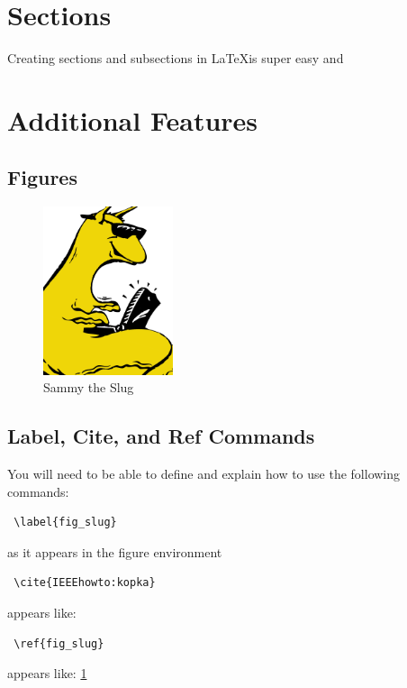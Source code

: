 \documentclass[12pt,journal,compsoc]{IEEEtran}
\begin{document}
\section{Sections}
Creating sections and subsections in \LaTeX \space is super easy and 



\section{Additional Features}

\subsection{Figures}


\begin{figure}[h] 	%
\centering
\includegraphics[width=1.5in]{slug.pdf}
\caption{Sammy the Slug}
\label{fig_slug}
\end{figure}


\subsection{Label, Cite, and Ref Commands}
You will need to be able to define and explain how to use the following commands:
\begin{verbatim} \label{fig_slug} \end{verbatim} as it appears in the figure environment\\
\begin{verbatim} \cite{IEEEhowto:kopka} \end{verbatim} appears like: \cite{IEEEhowto:kopka}\\
\begin{verbatim} \ref{fig_slug} \end{verbatim} appears like: \ref{fig_slug}\\
\end{document}
